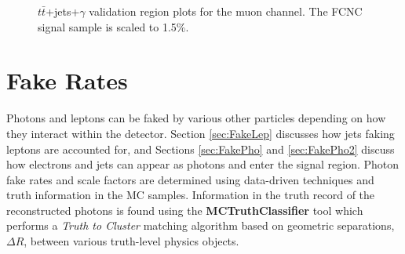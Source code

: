 \begin{figure}[h!]
\hfil  %
\caption{$t\bar{t}$+jets+$\gamma$ validation region plots for the muon channel.  The FCNC signal sample is scaled to 1.5\%.} %
\label{fig:VR2muj}
\end{figure}

\section{Fake Rates}
\label{sec:Fakes}

Photons and leptons can be faked by various other particles depending on how they interact within the detector.  Section \ref{sec:FakeLep} discusses how jets faking leptons are accounted for, and Sections \ref{sec:FakePho} and \ref{sec:FakePho2} discuss how electrons and jets can appear as photons and enter the signal region.  Photon fake rates and scale factors are determined using data-driven techniques and truth information in the MC samples.  Information in the truth record of the reconstructed photons is found using the \textbf{MCTruthClassifier} tool which performs a \textit{Truth to Cluster} matching algorithm based on geometric separations, $\Delta R$, between various truth-level physics objects.

